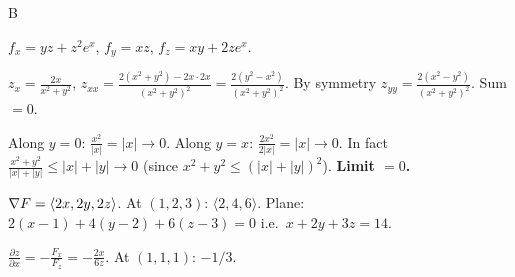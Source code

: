 \documentclass[11pt]{article}
\begin{document}
\begin{answers}{B}
\item $f_x = \boxed{yz + z^2 e^x}$, $f_y = \boxed{xz}$, $f_z = \boxed{xy + 2z e^x}$.
\item $z_x = \tfrac{2x}{x^2+y^2}$, $z_{xx} = \tfrac{2(x^2+y^2) - 2x \cdot 2x}{(x^2+y^2)^2} = \tfrac{2(y^2-x^2)}{(x^2+y^2)^2}$. By symmetry $z_{yy} = \tfrac{2(x^2 - y^2)}{(x^2+y^2)^2}$. Sum $= 0$. \checkmark
\item Along $y = 0$: $\tfrac{x^2}{|x|} = |x| \to 0$. Along $y = x$: $\tfrac{2x^2}{2|x|} = |x| \to 0$. In fact $\tfrac{x^2 + y^2}{|x|+|y|} \le |x|+|y| \to 0$ (since $x^2 + y^2 \le (|x|+|y|)^2$). \textbf{Limit $= 0$.}
\item $\nabla F = \langle 2x, 2y, 2z\rangle$. At $(1,2,3)$: $\langle 2, 4, 6\rangle$. Plane: $\boxed{2(x-1) + 4(y-2) + 6(z-3) = 0}$ i.e.\ $x + 2y + 3z = 14$.
\item $\tfrac{\partial z}{\partial x} = -\tfrac{F_x}{F_z} = -\tfrac{2x}{6z}$. At $(1,1,1)$: $\boxed{-1/3}$.
\end{answers}
\end{document}
